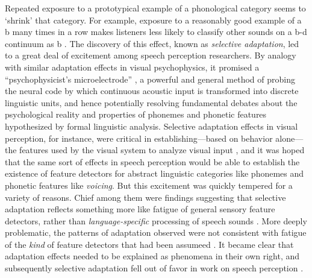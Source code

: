 Repeated exposure to a prototypical example of a phonological category seems to `shrink' that category. For example,  exposure to a reasonably good example of a \ph b many times in a row makes listeners less likely to classify other sounds on a \ph b-\ph d continuum as \ph b \autocite{Eimas1973}.  The discovery of this effect, known as \emph{selective adaptation}, led to a great deal of excitement among speech perception researchers.
By analogy with similar adaptation effects in visual psychophysics, it promised a ``psychophysicist's microelectrode'' \autocite{Frisby1979,Mollon1974}, a powerful and general method of probing the neural code by which continuous acoustic input is transformed into discrete linguistic units, and hence potentially resolving fundamental debates about the psychological reality and properties of phonemes and phonetic features hypothesized by formal linguistic analysis.  Selective adaptation effects in visual perception, for instance, were critical in establishing---based on behavior alone---the features used by the visual system to analyze visual input \autocite[e.g.,][]{Blakemore1969}, and it was hoped that the same sort of effects in speech perception would be able to establish the existence of feature detectors for abstract linguistic categories like phonemes and phonetic features like \emph{voicing}.
But this excitement was quickly tempered for a variety of reasons.  Chief among them were findings suggesting that selective adaptation reflects something more like fatigue of general sensory feature detectors, rather than \emph{language-specific} processing of speech sounds \autocite[e.g.,][]{Remez1979,Samuel1979,Schouten1980,Roberts1981}.  \label{r-fd1} More deeply problematic, the patterns of adaptation observed were not consistent with fatigue of the \emph{kind} of feature detectors that had been assumeed \autocite[see][for an excellent critique]{Remez1987}.  It became clear that adaptation effects needed to be explained as phenomena in their own right, and subsequently selective adaptation fell out of favor in work on speech perception \autocite[cf.][]{Remez1987,Samuel1986}.

